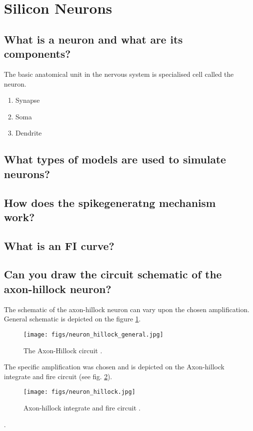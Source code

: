 \documentclass[main]{subfiles}
\begin{document}

\section{Silicon Neurons}
\subsection{What is a neuron and what are its components?}
The basic anatomical unit in the nervous system is specialised cell called the neuron.

\cite{book:Mead}

\begin{enumerate}
\item Synapse
\item Soma
\item Dendrite
\end{enumerate}
\subsection{What types of models are used to simulate neurons?}
\subsection{How does the spikegeneratng mechanism work?}
\subsection{What is an FI curve?}
\subsection{Can you draw the circuit schematic of the axon-hillock neuron?}
The schematic of the axon-hillock neuron can vary upon the chosen amplification. General schematic is depicted on the figure \ref{fig:neuron_hillock_general}.

\begin{figure}[htbp]
  \centering
  \texttt{[image: figs/neuron\_hillock\_general.jpg]}
  \caption{The Axon-Hillock circuit \cite{lec11}.}
  \label{fig:neuron_hillock_general}
\end{figure} 

The specific amplification was chosen and is depicted on the Axon-hillock integrate and fire circuit (see fig. \ref{fig:neuron_hillock}).

\begin{figure}[htbp]
  \centering
  \texttt{[image: figs/neuron\_hillock.jpg]}
  \caption{Axon-hillock integrate and fire circuit \cite{lab11}.}
  \label{fig:neuron_hillock}
\end{figure} 


\cite{lab11}.
\end{document}
